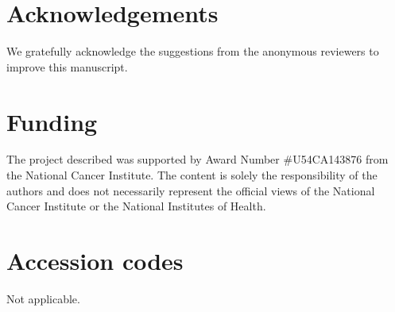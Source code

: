 \documentclass[fleqn,10pt]{wlscirep}
\begin{document}
\section*{Acknowledgements}
We gratefully acknowledge the suggestions from the anonymous reviewers to improve this manuscript.

\section*{Funding}
The project described was supported by Award Number \#U54CA143876 from the National Cancer Institute.
The content is solely the responsibility of the authors and does not necessarily represent the official views of the National Cancer Institute or the National Institutes of Health.

\section*{Accession codes}
Not applicable.

\clearpage





\clearpage
%
\end{document}
